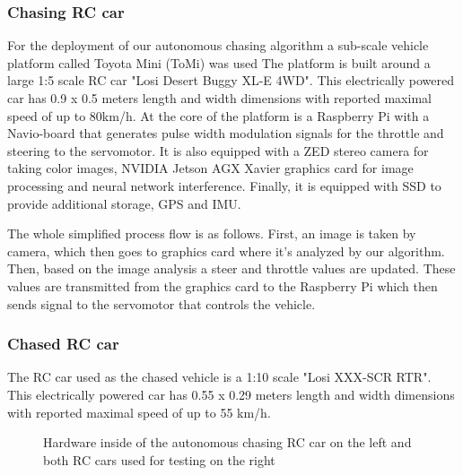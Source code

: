 \subsubsection{Chasing RC car}
For the deployment of our autonomous chasing algorithm a sub-scale vehicle platform called Toyota Mini (ToMi) was used %
The platform is built around a large 1:5 scale RC car "Losi Desert Buggy XL-E 4WD". This electrically powered car has 0.9 x 0.5 meters length and width dimensions with reported maximal speed of up to 80km/h. At the core of the platform is a Raspberry Pi with a Navio-board that generates pulse width modulation signals for the throttle and steering to the servomotor. It is also equipped with a ZED stereo camera for taking color images, NVIDIA Jetson AGX Xavier graphics card for image processing and neural network interference. Finally, it is equipped with SSD to provide additional storage, GPS and IMU. \par
The whole simplified process flow is as follows. First, an image is taken by camera, which then goes to graphics card where it's analyzed by our algorithm. Then, based on the image analysis a steer and throttle values are updated. These values are transmitted from the graphics card to the Raspberry Pi which then sends signal to the servomotor that controls the vehicle.

\subsubsection{Chased RC car}
The RC car used as the chased vehicle is a 1:10 scale "Losi XXX-SCR RTR". This electrically powered car has 0.55 x 0.29 meters length and width dimensions with reported maximal speed of up to 55 km/h.

\begin{figure}[h!]
    \centering
    \qquad
    \caption{Hardware inside of the autonomous chasing RC car on the left and both RC cars used for testing on the right}%
    \label{fig:rc_cars}%
\end{figure}

